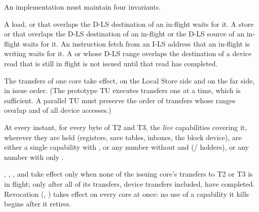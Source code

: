 An implementation must maintain four invariants.

\begin{description}[leftmargin=1em,style=nextline]
\item[I1. Local Store hazards stall.] A load,  or  that overlaps the D-LS
  destination of an in-flight  waits for it. A store or  that overlaps the D-LS
  destination of an in-flight  or the D-LS source of an in-flight  waits for it.
  An instruction fetch from an I-LS address that an in-flight  is writing waits for it.
  A  or  whose D-LS range overlaps the destination of a device read that is still
  in flight is not issued until that read has completed.
\item[I2. Per-core order.] The transfers of one core take effect, on the Local Store side and on the far
  side, in issue order. (The prototype TU executes transfers one at a time, which is sufficient. A
  parallel TU must preserve the order of transfers whose ranges overlap and of all device accesses.)
\item[I3. Exclusive writers.] At every instant, for every byte of T2 and T3, the \emph{live}
  capabilities covering it, wherever they are held (registers, save tables, inboxes, the block device),
  are either a single capability with , or any number without  and 
  (/ holders), or any number with only .
\item[I4. Publishing hand-overs.] , , ,  and
   take effect only when none of the issuing core's transfers to T2 or T3 is in flight;
   only after all of its transfers, device transfers included, have completed. Revocation (,
  ) takes effect on every core at once: no use of a capability it kills begins after
  it retires.
\end{description}

